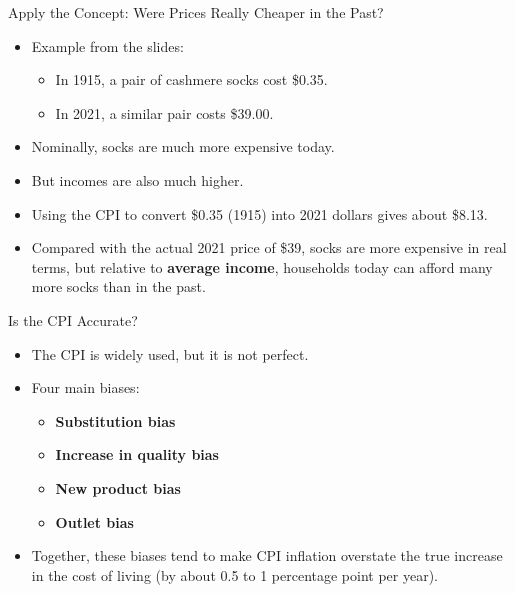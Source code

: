 \documentclass[aspectratio=169]{beamer}
\begin{document}
\begin{frame}{Apply the Concept: Were Prices Really Cheaper in the Past?}
\transfade
\begin{itemize}[<+->]
  \item Example from the slides:
  \begin{itemize}[<+->]
    \item In 1915, a pair of cashmere socks cost \$0.35.
    \item In 2021, a similar pair costs \$39.00.
  \end{itemize}
  \item Nominally, socks are much more expensive today.
  \item But incomes are also much higher.
  \item Using the CPI to convert \$0.35 (1915) into 2021 dollars gives about \$8.13.
  \item Compared with the actual 2021 price of \$39, socks are more expensive in real terms, but relative to \textbf{average income}, households today can afford many more socks than in the past.
\end{itemize}
\end{frame}

\begin{frame}{Is the CPI Accurate?}
\transfade
\begin{itemize}[<+->]
  \item The CPI is widely used, but it is not perfect.
  \item Four main biases:
  \begin{itemize}[<+->]
    \item \textbf{Substitution bias}
    \item \textbf{Increase in quality bias}
    \item \textbf{New product bias}
    \item \textbf{Outlet bias}
  \end{itemize}
  \item Together, these biases tend to make CPI inflation \alert{overstate} the true increase in the cost of living (by about 0.5 to 1 percentage point per year).
\end{itemize}
\end{frame}
\end{document}
